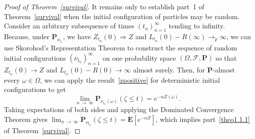 \documentclass[10pt]{amsart}
\theoremstyle{definition}\newtheorem{defi}[theo]{Definition}\newtheorem{rema}[theo]{Remark}\newtheorem{exam}[theo]{Example}\newtheorem{exem}[theo]{Example}\newtheorem{nota}[theo]{Notation}
\newcommand*\E{\mathbf{E}}
\renewcommand*\P{\mathbf{P}}
\newcommand\F{\mathcal{F}}
\newcommand{\1} {\mathds{1}}
\begin{document}
\begin{proof}[Proof of Theorem~\ref{survival}]
It remains only to establish part~1 of Theorem~\ref{survival} when the initial configuration of particles may be random. Consider an arbitrary subsequence of times $(t_n)_{n=1}^{\infty}$ tending to infinity. Because, under $\P_{\nu_{t_n}}$, we have $Z_{t_n}(0) \Rightarrow Z$ and $L_{t_n}(0) - R(\infty) \rightarrow_p \infty$, we can use Skorohod's Representation Theorem to construct the sequence of random initial configurations $(\nu_{t_n})_{n=1}^{\infty}$ on one probability space $(\Omega, \F, \P)$ so that $Z_{t_n}(0) \rightarrow Z$ and $L_{t_n}(0) - R(0) \rightarrow \infty$ almost surely. Then, for $\P$-almost every $\omega \in \Omega$, we can apply the result~\eqref{zpositive} for deterministic initial configurations to get
\[
\lim_{n\,\rightarrow\,\infty} \P_{\nu_{t_n}(\omega)}(\zeta \leq t) = e^{-\alpha Z(\omega)}.
\]
Taking expectations of both sides and applying the Dominated Convergence Theorem gives $\lim_{n\,\rightarrow\,\infty} \P_{\nu_{t_n}}(\zeta \leq t) = \E[e^{-\alpha Z}]$, which implies part~\eqref{theo1.1.1} of Theorem~\ref{survival}.
\end{proof}
\end{document}
